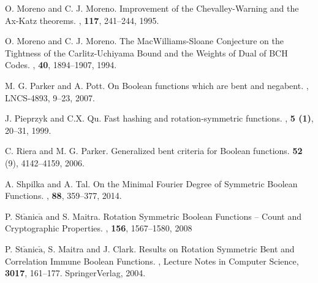 \begin{thebibliography}{1}
 O. Moreno and C. J. Moreno.
\newblock Improvement of the Chevalley-Warning and the Ax-Katz theorems.
, {\bf 117}, 241--244, 1995.

 O. Moreno and C. J. Moreno.
\newblock The MacWilliams-Sloane Conjecture on the Tightness of the Carlitz-Uchiyama Bound and the Weights of Dual of BCH Codes.
, {\bf 40},  1894--1907, 1994.

 M. G. Parker and A. Pott. 
\newblock On Boolean functions which are bent and negabent.
,
LNCS-4893, 9--23, 2007.

 J. Pieprzyk and C.X. Qu.
\newblock Fast hashing and rotation-symmetric functions.
, {\bf 5 (1)}, 20--31, 1999.

 C. Riera and M. G. Parker.
\newblock Generalized bent criteria for Boolean functions.
 {\bf 52} (9), 4142--4159, 2006.

 A. Shpilka and A. Tal.
\newblock On the Minimal Fourier Degree of Symmetric Boolean Functions.
, {\bf 88}, 359--377, 2014.

 P. St$\check{\mbox{a}}$nic$\check{\mbox{a}}$ and S. Maitra. 
\newblock Rotation Symmetric Boolean Functions -- Count and Cryptographic Properties. 
, {\bf 156}, 1567--1580, 2008

 P. St$\check{\mbox{a}}$nic$\check{\mbox{a}}$, S. Maitra and J. Clark. 
\newblock Results on Rotation Symmetric Bent and Correlation Immune Boolean Functions. 
, Lecture Notes in Computer Science, {\bf 3017}, 161--177. SpringerVerlag, 2004.

\end{thebibliography}

%









%			

